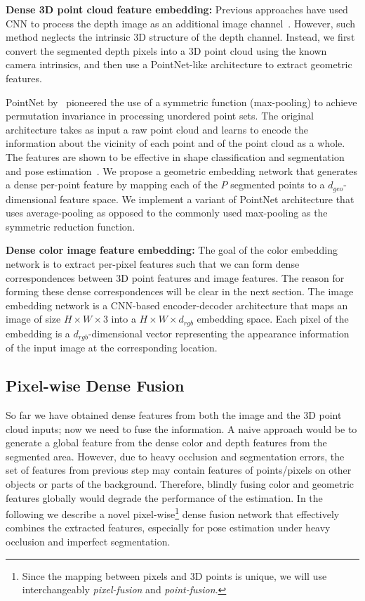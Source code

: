 \documentclass[10pt,twocolumn,letterpaper]{article}
\begin{document}
\noindent\textbf{Dense 3D point cloud feature embedding:}
Previous approaches have used CNN to process the depth image as an additional image channel~\cite{li2018unified}. However, such method neglects the intrinsic 3D structure of the depth channel. Instead, we first convert the segmented depth pixels into a 3D point cloud using the known camera intrinsics, and then use a PointNet-like architecture to extract geometric features. 

PointNet by~\citet{qi2016pointnet} pioneered the use of a symmetric function (max-pooling) to achieve permutation invariance in processing unordered point sets. The original architecture takes as input a raw point cloud and learns to encode the information about the vicinity of each point and of the point cloud as a whole. The features are shown to be effective in shape classification and segmentation~\cite{qi2016pointnet} and pose estimation~\cite{xu2017pointfusion,qi2017frustum}. We propose a geometric embedding network that generates a dense per-point feature by mapping each of the $P$ segmented points to a $d_{geo}$-dimensional feature space. We implement a variant of PointNet architecture that uses average-pooling as opposed to the commonly used max-pooling as the symmetric reduction function.

\noindent\textbf{Dense color image feature embedding:}
The goal of the color embedding network is to extract per-pixel features such that we can form dense correspondences between 3D point features and image features. The reason for forming these dense correspondences will be clear in the next section. The image embedding network is a CNN-based encoder-decoder architecture that maps an image of size $H\times W\times 3$ into a $H\times W\times d_{rgb}$ embedding space. Each pixel of the embedding is a $d_{rgb}$-dimensional vector representing the appearance information of the input image at the corresponding location.

\subsection{Pixel-wise Dense Fusion}
\label{ssec:pwdf}

So far we have obtained dense features from both the image and the 3D point cloud inputs; now we need to fuse the information. A naive approach would be to generate a global feature from the dense color and depth features from the segmented area. However, due to heavy occlusion and segmentation errors, the set of features from previous step may contain features of points/pixels on other objects or parts of the background. Therefore, blindly fusing color and geometric features globally would degrade the performance of the estimation. In the following we describe a novel pixel-wise\footnote{Since the mapping between pixels and 3D points is unique, we will use interchangeably \emph{pixel-fusion} and \emph{point-fusion}.} dense fusion network that effectively combines the extracted features, especially for pose estimation under heavy occlusion and imperfect segmentation.
\end{document}
